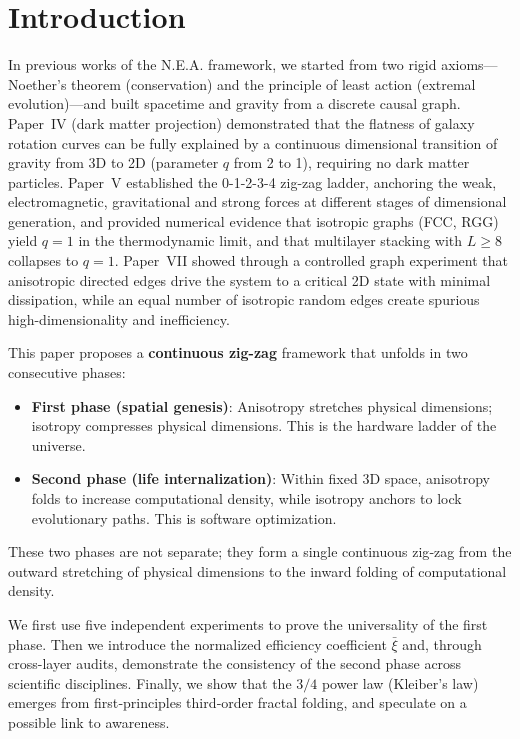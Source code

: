 \documentclass[12pt,a4paper]{article}
\begin{document}
\section{Introduction}

In previous works of the N.E.A. framework, we started from two rigid axioms—Noether's theorem (conservation) and the principle of least action (extremal evolution)—and built spacetime and gravity from a discrete causal graph. Paper~IV (dark matter projection) demonstrated that the flatness of galaxy rotation curves can be fully explained by a continuous dimensional transition of gravity from 3D to 2D (parameter $q$ from 2 to 1), requiring no dark matter particles. Paper~V established the 0-1-2-3-4 zig-zag ladder, anchoring the weak, electromagnetic, gravitational and strong forces at different stages of dimensional generation, and provided numerical evidence that isotropic graphs (FCC, RGG) yield $q=1$ in the thermodynamic limit, and that multilayer stacking with $L\ge8$ collapses to $q=1$. Paper~VII showed through a controlled graph experiment that anisotropic directed edges drive the system to a critical 2D state with minimal dissipation, while an equal number of isotropic random edges create spurious high-dimensionality and inefficiency.

This paper proposes a \textbf{continuous zig-zag} framework that unfolds in two consecutive phases:
\begin{itemize}
    \item \textbf{First phase (spatial genesis)}: Anisotropy stretches physical dimensions; isotropy compresses physical dimensions. This is the hardware ladder of the universe.
    \item \textbf{Second phase (life internalization)}: Within fixed 3D space, anisotropy folds to increase computational density, while isotropy anchors to lock evolutionary paths. This is software optimization.
\end{itemize}
These two phases are not separate; they form a single continuous zig‑zag from the outward stretching of physical dimensions to the inward folding of computational density.

We first use five independent experiments to prove the universality of the first phase. Then we introduce the normalized efficiency coefficient $\bar{\xi}$ and, through cross-layer audits, demonstrate the consistency of the second phase across scientific disciplines. Finally, we show that the $3/4$ power law (Kleiber's law) emerges from first‑principles third‑order fractal folding, and speculate on a possible link to awareness.
\end{document}
